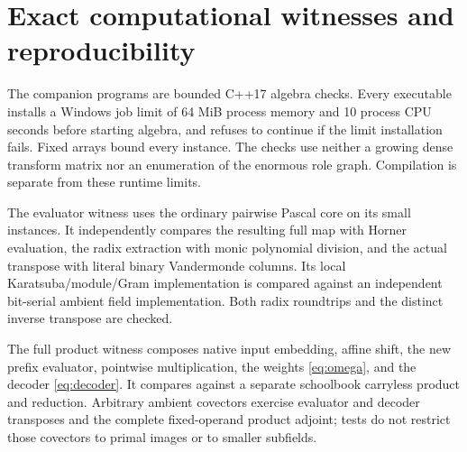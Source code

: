 \section{Exact computational witnesses and reproducibility}\label{sec:evidence}

The companion programs are bounded C++17 algebra checks. Every executable
installs a Windows job limit of 64 MiB process memory and 10 process
CPU seconds before starting algebra, and refuses to continue if the
limit installation fails. Fixed arrays bound every instance. The checks
use neither a growing dense transform matrix nor an enumeration of the
enormous role graph. Compilation is separate from these runtime limits.

The evaluator witness uses the ordinary pairwise Pascal core on its
small instances. It independently compares the resulting full map
with Horner evaluation, the radix extraction with monic polynomial
division, and the actual transpose with literal binary Vandermonde
columns. Its local Karatsuba/module/Gram implementation is compared
against an independent bit-serial ambient field implementation.
Both radix roundtrips and the distinct inverse transpose are checked.

The full product witness composes native input embedding, affine shift,
the new prefix evaluator, pointwise multiplication, the weights
\eqref{eq:omega}, and the decoder \eqref{eq:decoder}. It compares
against a separate schoolbook carryless product and reduction. Arbitrary
ambient covectors exercise evaluator and decoder transposes and the
complete fixed-operand product adjoint; tests do not restrict those
covectors to primal images or to smaller subfields.

